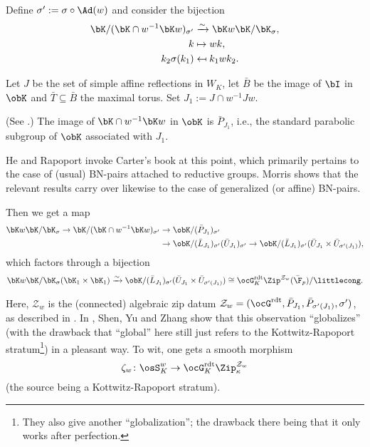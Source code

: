 \documentclass[a4paper]{scrartcl} %
\numberwithin{equation}{section}
\begin{document}
Define $\sigma':=\sigma\circ\Ad(w)$ and consider the bijection
\begin{align*}
  \bK/(\bK\cap w^{-1}\bK w)_{\sigma'} &\xrightarrow{\sim} \bK w\bK/\bK_\sigma, \\
  k &\mapsto wk, \\
  k_2\sigma(k_1) &\mapsfrom k_1wk_2.
\end{align*}

Let $J$ be the set of simple affine reflections in $W_K$, let $\bar B$ be the image of $\bI$ in $\obK$ and $\bar T\subseteq \bar B$ the maximal torus. Set $J_1:=J\cap w^{-1}Jw$.

\begin{Proposition}\label{propmorris}
  \textnormal{(See \cite[Lemma~3.19]{morris}.)}
  The image of $\bK \cap w^{-1} \bK w$ in $\obK$ is $\bar{P}_{J_1}$, i.e., the standard parabolic subgroup of $\obK$ associated with $J_1$.
\end{Proposition}

\begin{Remark}
  He and Rapoport invoke Carter's book \cite{carter} at this point, which primarily pertains to the case of (usual) BN-pairs attached to reductive groups. Morris \cite{morris} shows that the relevant results carry over likewise to the case of generalized (or affine) BN-pairs.
\end{Remark}

Then we get a map
\begin{align*}
  \bK w\bK/\bK_\sigma \to \bK/(\bK\cap w^{-1}\bK w)_{\sigma'}  &\to \obK / (\bar{P}_{J_1})_{\sigma'} \\
  &\to \obK / (\bar{L}_{J_1})_{\sigma'}(\bar{U}_{J_1})_{\sigma'} \to \obK / (\bar{L}_{J_1})_{\sigma'}(\bar{U}_{J_1}\times \bar{U}_{\sigma'(J_1)}),
\end{align*}
which factors through a bijection
\begin{equation*}
  \bK w\bK/\bK_\sigma(\bK_1\times\bK_1) \xrightarrow{\sim}
  \obK / (\bar{L}_{J_1})_{\sigma'}(\bar{U}_{J_1}\times \bar{U}_{\sigma'(J_1)}) \cong \ocG_K^\mathrm{rdt}\Zip^{\mathcal{Z}_w}(\bar\F_p)/{\littlecong}.
\end{equation*}

Here, $\mathcal{Z}_w$ is the (connected) algebraic zip datum $\mathcal{Z}_w=(\ocG^\mathrm{rdt},\bar{P}_{J_1},\bar{P}_{\sigma'(J_1)},\sigma')$, as described in \cite{SYZnew}. In \cite{SYZnew}, Shen, Yu and Zhang show that this observation ``globalizes'' (with the drawback that ``global'' here still just refers to the Kottwitz-Rapoport stratum\footnote{They also give another ``globalization''; the drawback there being that it only works after perfection.}) in a pleasant way. To wit, one gets a smooth morphism \cite[Theorem~A]{SYZnew}
\begin{equation*}
  \zeta_w\colon \osS_K^w \to \ocG_K^\mathrm{rdt}\Zip^{\mathcal{Z}_w}_\kappa
\end{equation*}
(the source being a Kottwitz-Rapoport stratum).
\end{document}
